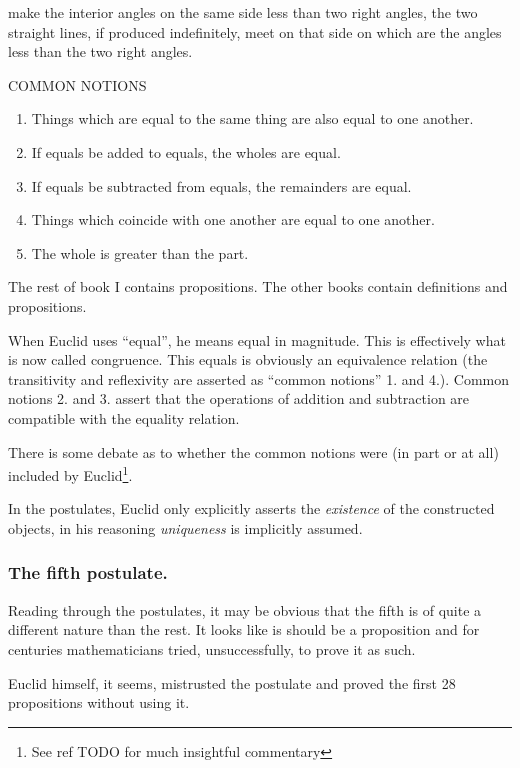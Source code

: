 \begin{displayquote}
\begin{enumerate}
make the interior angles on the same side less than two right
angles, the two straight lines, if produced indefinitely, meet
on that side on which are the angles less than the two right
angles.
\end{enumerate}
{\centering COMMON NOTIONS\par}
\begin{enumerate}
\item Things which are equal to the same thing are also
equal to one another.
\item If equals be added to equals, the wholes are equal.
\item If equals be subtracted from equals, the remainders
are equal.
\item Things which coincide with one another are equal to
one another.
\item The whole is greater than the part.
\end{enumerate}
\end{displayquote}

The rest of book I contains propositions. The other books contain definitions and propositions.

When Euclid uses ``equal'', he means equal in magnitude. This is effectively what is now called congruence. This equals is obviously an equivalence relation (the transitivity and reflexivity are asserted as ``common notions'' 1. and 4.). Common notions 2. and 3. assert that the operations of addition and subtraction are compatible with the equality relation.

There is some debate as to whether the common notions were (in part or at all) included by Euclid\footnote{See ref TODO for much insightful commentary}. 

In the postulates, Euclid only explicitly asserts the \textit{existence} of the constructed objects, in his reasoning \textit{uniqueness} is implicitly assumed. 

\subsubsection{The fifth postulate.} Reading through the postulates, it may be obvious that the fifth is of quite a different nature than the rest. It looks like is should be a proposition and for centuries mathematicians tried, unsuccessfully, to prove it as such.

Euclid himself, it seems, mistrusted the postulate and proved the first 28 propositions without using it.

